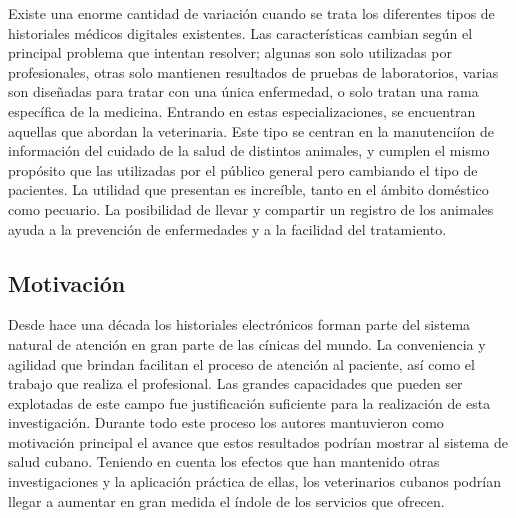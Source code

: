 Existe una enorme cantidad de variaci\'on cuando se trata los diferentes tipos de historiales m\'edicos digitales existentes. Las caracter\'isticas cambian seg\'un el principal problema que intentan resolver; algunas son solo utilizadas por profesionales, otras solo mantienen resultados de pruebas de laboratorios, varias son diseñadas para tratar con una \'unica enfermedad, o solo tratan una rama espec\'ifica de la medicina. Entrando en estas especializaciones, se encuentran aquellas que abordan la veterinaria. Este tipo se centran en la manutenci\'ion de informaci\'on del cuidado de la salud de distintos animales, y cumplen el mismo prop\'osito que las utilizadas por el p\'ublico general pero cambiando el tipo de pacientes. La utilidad que presentan es incre\'ible, tanto en el \'ambito dom\'estico como pecuario. La posibilidad de llevar y compartir un registro de los animales ayuda a la prevenci\'on de enfermedades y a la facilidad del tratamiento. 
\subsection*{Motivaci\'on}
Desde hace una d\'ecada los historiales electr\'onicos forman parte del sistema natural de atenci\'on en gran parte de las c\'inicas del mundo. La conveniencia y agilidad que brindan facilitan el proceso de atenci\'on al paciente, as\'i como el trabajo que realiza el profesional. Las grandes capacidades que pueden ser explotadas de este campo fue justificaci\'on suficiente para la realizaci\'on de esta investigaci\'on. Durante todo este proceso los autores mantuvieron como motivaci\'on principal el avance que estos resultados podr\'ian mostrar al sistema de salud cubano. Teniendo en cuenta los efectos que han mantenido otras investigaciones y la aplicaci\'on pr\'actica de ellas, los veterinarios cubanos podr\'ian llegar a aumentar en gran medida el \'indole de los servicios que ofrecen.
